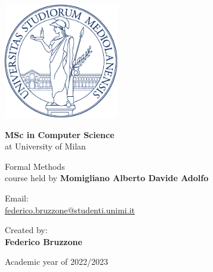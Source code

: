 \documentclass[a4paper]{article}
\begin{document}


\begin{titlepage}
    \begin{center}
        \includegraphics[height=5cm]{minerva.pdf} %

        \vspace*{1.75cm}

        \LARGE


        \textbf{MSc in Computer Science} \\
        at University of Milan

        \vspace*{1cm}


        \huge
        Formal Methods\\

        \large course held by \textbf{Momigliano Alberto Davide Adolfo}


        \normalsize
        \vspace*{4cm}

        \begin{minipage}[t]{0.47\textwidth}
	       {Email: } \vspace{0.3em} \\
              {\large \href{federico.bruzzone@studenti.unimi.it}{federico.bruzzone@studenti.unimi.it}} \vspace{1em}  \\
        \end{minipage}
        \hfill
        \begin{minipage}[t]{0.47\textwidth}\raggedleft
	       {Created by:} \hspace{-0.9em} \vspace{0.3em} \\
              {\large \textbf{Federico Bruzzone}} \\
              \vspace{1em}
        \end{minipage}

        \vfill
        Academic year of 2022/2023

    \end{center}
\end{titlepage}
\end{document}
